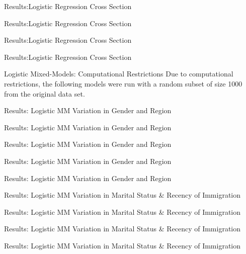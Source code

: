 
\begin{frame}{Results:Logistic Regression Cross Section}
    
\end{frame}
\begin{frame}{Results:Logistic Regression Cross Section}
    
\end{frame}
\begin{frame}{Results:Logistic Regression Cross Section}
    
\end{frame}
\begin{frame}{Results:Logistic Regression Cross Section}
    
\end{frame}
\begin{frame}{Logistic Mixed-Models: Computational Restrictions}
Due to computational restrictions, the following models were run with a random subset of size 1000 from the original data set.
    
\end{frame}
\begin{frame}{Results: Logistic MM Variation in Gender and Region}
    
\end{frame}
\begin{frame}{Results: Logistic MM Variation in Gender and Region}
    
\end{frame}
\begin{frame}{Results: Logistic MM Variation in Gender and Region}
    
\end{frame}
\begin{frame}{Results: Logistic MM Variation in Gender and Region}
    
\end{frame}
\begin{frame}{Results: Logistic MM Variation in Gender and Region}
    
\end{frame}

\begin{frame}{Results: Logistic MM Variation in Marital Status \& Recency of Immigration}
    
\end{frame}
\begin{frame}{Results: Logistic MM Variation in Marital Status \& Recency of Immigration}
    
\end{frame}
\begin{frame}{Results: Logistic MM Variation in Marital Status \& Recency of Immigration}
    
\end{frame}
\begin{frame}{Results: Logistic MM Variation in Marital Status \& Recency of Immigration}
    
\end{frame}